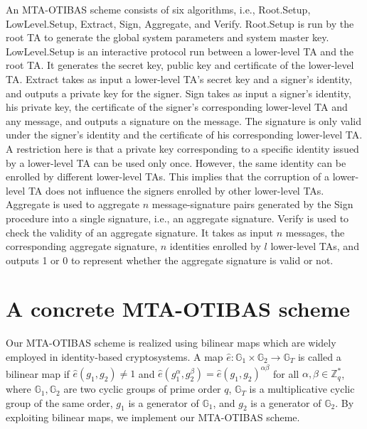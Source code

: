 \documentclass[10pt,journal,compsoc]{IEEEtran}
\begin{document}
An MTA-OTIBAS scheme consists of six
algorithms, i.e., {\sf Root.Setup}, {\sf LowLevel.Setup}, {\sf
Extract}, {\sf Sign}, {\sf Aggregate}, and {\sf Verify}. {\sf
Root.Setup} is run by the root TA to generate the global system
parameters and system master key. {\sf LowLevel.Setup} is an
interactive protocol run between a lower-level TA and the root TA.
It generates the secret key, public key and certificate of the
lower-level TA. {\sf Extract} takes as input a lower-level TA's
secret key and a signer's identity, and outputs a private key for
the signer. {\sf Sign} takes as input a signer's identity, his private
key, the certificate of the signer's corresponding lower-level TA
and any message, and outputs a signature on the message. The
signature is only valid under the signer's identity and the
certificate of his corresponding lower-level TA. A restriction
here is that a private key corresponding to a specific identity
issued by a lower-level TA can be used only once. However, the same
identity can be enrolled by different lower-level TAs. This implies
that the corruption of a lower-level TA does not influence the signers
enrolled by other lower-level TAs. {\sf Aggregate} is used to
aggregate $n$ message-signature pairs generated by the {\sf Sign}
procedure into a single signature, i.e., an aggregate signature. {\sf
Verify} is used to check the validity of an aggregate signature. It
takes as input $n$ messages, the corresponding aggregate signature,
$n$ identities enrolled by $l$ lower-level TAs, and outputs 1 or 0
to represent whether the aggregate signature is valid or not.


\section{A concrete MTA-OTIBAS scheme}
\label{specific}

Our MTA-OTIBAS scheme is
realized using bilinear
maps which are
widely employed in identity-based cryptosystems. A map
$\hat{e}:\mathbb{G}_1\times \mathbb{G}_2\rightarrow \mathbb{G}_T$ is
called a bilinear map if $\hat{e}(g_1,g_2)\neq 1$ and
$\hat{e}(g_1^\alpha,g_2^\beta)=\hat{e}(g_1,g_2)^{\alpha\beta}$ for
all $\alpha, \beta\in \mathbb{Z}_q^*$, where $\mathbb{G}_1,\mathbb{G}_2$ are
two cyclic groups of prime order $q$, $\mathbb{G}_T$ is a
multiplicative cyclic group of the same order, $g_1$ is a generator
of $\mathbb{G}_1$, and $g_2$ is a generator of $\mathbb{G}_2$. By
exploiting bilinear maps, we implement our MTA-OTIBAS scheme.
\end{document}
